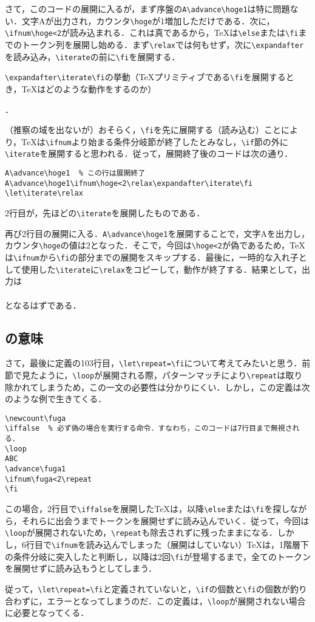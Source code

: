 \documentclass[autodetect-engine,dvipdfmx]{jsarticle}
\begin{document}
さて，このコードの展開に入るが，まず序盤の\verb|A\advance\hoge1|は特に問題ない．文字Aが出力され，カウンタ\verb|\hoge|が1増加しただけである．次に，\verb|\ifnum\hoge<2|が読み込まれる．これは真であるから，\TeX は\verb|\else|または\verb|\fi|までのトークン列を展開し始める．まず\verb|\relax|では何もせず，次に\verb|\expandafter|を読み込み，\verb|\iterate|の前に\verb|\fi|を展開する．

\begin{question}
\verb|\expandafter\iterate\fi|の挙動（\TeX プリミティブである\verb|\fi|を展開するとき，\TeX はどのような動作をするのか）
\end{question}．
\begin{answer}
（推察の域を出ないが）おそらく，\verb|\fi|を先に展開する（読み込む）ことにより，\TeX は\verb|\ifnum|より始まる条件分岐節が終了したとみなし，\verb|\if|節の外に\verb|\iterate|を展開すると思われる．従って，展開終了後のコードは次の通り．

\begin{lstlisting}
A\advance\hoge1  % この行は展開終了
A\advance\hoge1\ifnum\hoge<2\relax\expandafter\iterate\fi
\let\iterate\relax
\end{lstlisting}
2行目が，先ほどの\verb|\iterate|を展開したものである．
\end{answer}

再び2行目の展開に入る．\verb|A\advance\hoge1|を展開することで，文字Aを出力し，カウンタ\verb|\hoge|の値は2となった．そこで，今回は\verb|\hoge<2|が偽であるため，\TeX は\verb|\ifnum|から\verb|\fi|の部分までの展開をスキップする．最後に，一時的な入れ子として使用した\verb|\iterate|に\verb|\relax|をコピーして，動作が終了する．結果として，出力は\\
\hspace{3zw}\\
となるはずである．

\subsection{の意味}

さて，最後に定義の103行目，\verb|\let\repeat=\fi|について考えてみたいと思う．前節で見たように，\verb|\loop|が展開される際，パターンマッチにより\verb|\repeat|は取り除かれてしまうため，この一文の必要性は分かりにくい．しかし，この定義は次のような例で生きてくる．
\begin{lstlisting}
\newcount\fuga
\iffalse  % 必ず偽の場合を実行する命令．すなわち，このコードは7行目まで無視される．
\loop
ABC
\advance\fuga1
\ifnum\fuga<2\repeat
\fi
\end{lstlisting}
この場合，2行目で\verb|\iffalse|を展開した\TeX は，以降\verb|\else|または\verb|\fi|を探しながら，それらに出会うまでトークンを展開せずに読み込んでいく．従って，今回は\verb|\loop|が展開されないため，\verb|\repeat|も除去されずに残ったままになる．しかし，6行目で\verb|\ifnum|を読み込んでしまった（展開はしていない）\TeX は，1階層下の条件分岐に突入したと判断し，以降は2回\verb|\fi|が登場するまで，全てのトークンを展開せずに読み込もうとしてしまう．

従って，\verb|\let\repeat=\fi|と定義されていないと，\verb|\if|の個数と\verb|\fi|の個数が釣り合わずに，エラーとなってしまうのだ．この定義は，\verb|\loop|が展開されない場合に必要となってくる．
\end{document}
